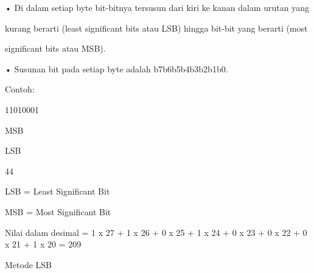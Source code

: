 \documentclass{article}
\begin{document}

• Di dalam setiap byte bit-bitnya tersusun dari kiri ke kanan dalam urutan yang 

kurang berarti (least significant bits atau LSB) hingga bit-bit yang berarti (most 

significant bits atau MSB). 

• Susunan bit pada setiap byte adalah b7b6b5b4b3b2b1b0. 

 Contoh: 



11010001




  MSB  

       LSB

44

LSB = Least Significant Bit

MSB = Most Significant Bit

Nilai dalam desimal = 1 x 27 + 1 x 26 + 0 x 25 + 1 x 24 + 0 x 23 + 0 x 22 + 0 x 21 + 1 x 20  = 209 

Metode LSB
\end{document}

